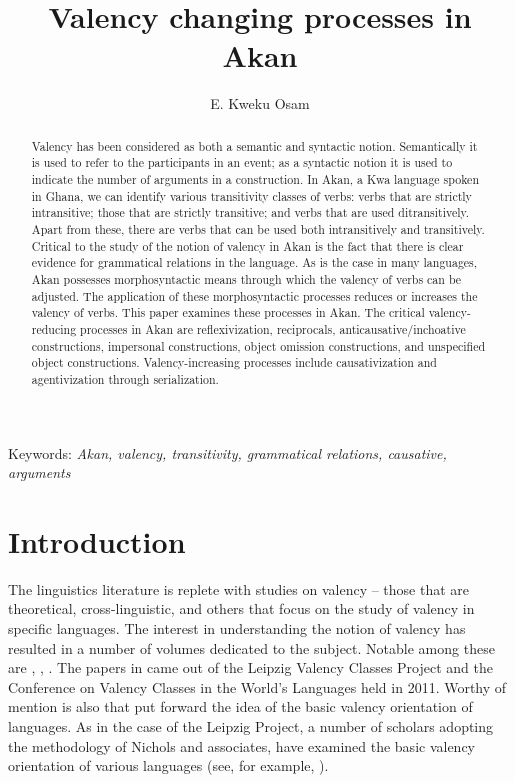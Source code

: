 \documentclass[output=paper]{langsci/langscibook}
\title{Valency changing processes in {Akan} }
\author{%
E. Kweku Osam\affiliation{University of Ghana} 
}
\begin{document}
\begin{abstract}
Valency has been considered as both a semantic and syntactic notion. Semantically it is used to refer to the participants in an event; as a syntactic notion it is used to indicate the number of arguments in a construction. In Akan, a Kwa language spoken in Ghana, we can identify various transitivity classes of verbs: verbs that are strictly intransitive; those that are strictly transitive; and verbs that are used ditransitively. Apart from these, there are verbs that can be used both intransitively and transitively. Critical to the study of the notion of valency in Akan is the fact that there is clear evidence for grammatical relations in the language. As is the case in many languages, Akan possesses morphosyntactic means through which the valency of verbs can be adjusted. The application of these morphosyntactic processes reduces or increases the valency of verbs. This paper examines these processes in Akan. The critical valency-reducing processes in Akan are reflexivization, reciprocals, anticausative/inchoative constructions, impersonal constructions, object omission constructions, and unspecified object constructions. Valency-increasing processes include causativization and agentivization through serialization.
\end{abstract}

Keywords: \textit{Akan, valency, transitivity, grammatical relations, causative, arguments}

\section{Introduction}\label{§1:introduction.osam}

The linguistics literature is replete with studies on valency -- those that are theoretical, cross-linguistic, and others that focus on the study of valency in specific languages. The interest in understanding the notion of valency has resulted in a number of volumes dedicated to the subject. Notable among these are \citet{comriepolinsky1993}, \citet{dixonaikhenvald2000a}, \citet{malchukovcomrieinpress}. The papers in \citet{malchukovcomrieinpress} came out of the Leipzig Valency Classes Project and the Conference on Valency Classes in the World's Languages held in 2011. Worthy of mention is also \citet{nicholsetal2004} that put forward the idea of the basic valency orientation of languages. As in the case of the Leipzig Project, a number of scholars adopting the methodology of Nichols and associates, have examined the basic valency orientation of various languages (see, for example, \citealt{narogg2009,planklahiri2009,vangelderen2011,luraghi2012}).  
\end{document}
